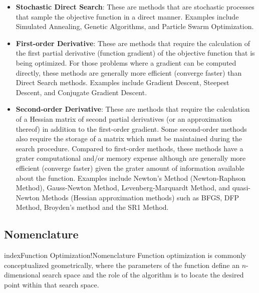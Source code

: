 \begin{bibunit}
\begin{itemize}
	\item \textbf{Stochastic Direct Search}: These are methods that are stochastic processes that sample the objective function in a direct manner. Examples include Simulated Annealing, Genetic Algorithms, and Particle Swarm Optimization.

	\item \textbf{First-order Derivative}: These are methods that require the calculation of the first partial derivative (function gradient) of the objective function that is being optimized. For those problems where a gradient can be computed directly, these methods are generally more efficient (converge faster) than Direct Search methods. Examples include Gradient Descent, Steepest Descent, and Conjugate Gradient Descent.

	\item \textbf{Second-order Derivative}: These are methods that require the calculation of a Hessian matrix of second partial derivatives (or an approximation thereof) in addition to the first-order gradient. Some second-order methods also require the storage of a matrix which must be maintained during the search procedure. Compared to first-order methods, these methods have a grater computational and/or memory expense although are generally more efficient (converge faster) given the grater amount of information available about the function. Examples include Newton's Method (Newton-Raphson Method), Gauss-Newton Method, Levenberg-Marquardt Method, and quasi-Newton Methods (Hessian approximation methods) such as BFGS, DFP Method, Broyden's method and the SR1 Method.
\end{itemize}

\subsection{Nomenclature}
index{Function Optimization!Nomenclature}
Function optimization is commonly conceptualized geometrically, where the parameters of the function define an $n$-dimensional search space and the role of the algorithm is to locate the desired point within that search space.


\end{bibunit}
